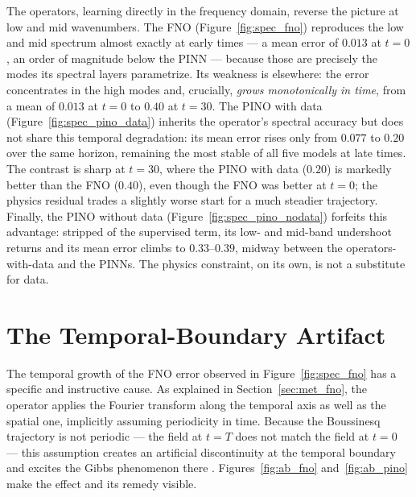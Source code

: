 The operators, learning directly in the frequency domain, reverse the picture at low and mid wavenumbers. The FNO (Figure~\ref{fig:spec_fno}) reproduces the low and mid spectrum almost exactly at early times --- a mean error of $0.013$ at $t = 0$, an order of magnitude below the PINN --- because those are precisely the modes its spectral layers parametrize. Its weakness is elsewhere: the error concentrates in the high modes and, crucially, \emph{grows monotonically in time}, from a mean of $0.013$ at $t = 0$ to $0.40$ at $t = 30$. The PINO with data (Figure~\ref{fig:spec_pino_data}) inherits the operator's spectral accuracy but does not share this temporal degradation: its mean error rises only from $0.077$ to $0.20$ over the same horizon, remaining the most stable of all five models at late times. The contrast is sharp at $t = 30$, where the PINO with data ($0.20$) is markedly better than the FNO ($0.40$), even though the FNO was better at $t = 0$; the physics residual trades a slightly worse start for a much steadier trajectory. Finally, the PINO without data (Figure~\ref{fig:spec_pino_nodata}) forfeits this advantage: stripped of the supervised term, its low- and mid-band undershoot returns and its mean error climbs to $0.33$--$0.39$, midway between the operators-with-data and the PINNs. The physics constraint, on its own, is not a substitute for data.

\section{The Temporal-Boundary Artifact}
\label{sec:res_gibbs}

The temporal growth of the FNO error observed in Figure~\ref{fig:spec_fno} has a specific and instructive cause. As explained in Section~\ref{sec:met_fno}, the operator applies the Fourier transform along the temporal axis as well as the spatial one, implicitly assuming periodicity in time. Because the Boussinesq trajectory is not periodic --- the field at $t = T$ does not match the field at $t = 0$ --- this assumption creates an artificial discontinuity at the temporal boundary and excites the Gibbs phenomenon there \parencite{gibbs1899}. Figures~\ref{fig:ab_fno} and~\ref{fig:ab_pino} make the effect and its remedy visible.

